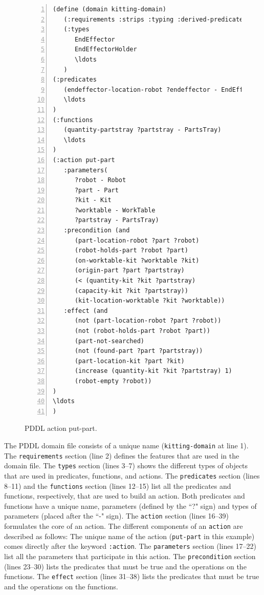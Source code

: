 \begin{figure}[t!h!]
\centering
\begin{minipage}{.5\paperwidth}
\begin{list}{}{\setlength{\leftmargin}{1em}}\item\small
\begin{Verbatim}[commandchars=\\\{\},fontsize=\scriptsize, numbers=left, numbersep=2pt]
(define (domain kitting-domain)
   (:requirements :strips :typing :derived-predicates :action-costs :fluents)
   (:types
      EndEffector
      EndEffectorHolder 
      \ldots
   )
(:predicates
   (endeffector-location-robot ?endeffector - EndEffector ?robot - Robot)	
   \ldots
)
(:functions
   (quantity-partstray ?partstray - PartsTray)
   \ldots
)
(:action put-part
   :parameters(
      ?robot - Robot
      ?part - Part
      ?kit - Kit
      ?worktable - WorkTable
      ?partstray - PartsTray)
   :precondition (and
      (part-location-robot ?part ?robot)
      (robot-holds-part ?robot ?part)
      (on-worktable-kit ?worktable ?kit)
      (origin-part ?part ?partstray)
      (< (quantity-kit ?kit ?partstray)
      (capacity-kit ?kit ?partstray))
      (kit-location-worktable ?kit ?worktable))
   :effect (and
      (not (part-location-robot ?part ?robot))
      (not (robot-holds-part ?robot ?part))
      (part-not-searched)
      (not (found-part ?part ?partstray))
      (part-location-kit ?part ?kit)
      (increase (quantity-kit ?kit ?partstray) 1)
      (robot-empty ?robot))
)
\ldots
)
\end{Verbatim}
\end{list}
\end{minipage}
\caption{PDDL action put-part.}
\label{fig:put-part}
\end{figure}
The PDDL domain file consists of a unique name (\texttt{kitting-domain} at line 1). The \texttt{requirements} section (line 2) defines the features that are used in the domain file. The \texttt{types} section (lines 3--7) shows the different types of objects that are used in predicates, functions, and actions. The \texttt{predicates} section (lines 8--11) and the \texttt{functions} section (lines 12--15) list all the predicates and functions, respectively, that are used to build an action. Both predicates and functions have a unique name, parameters (defined by the ``?" sign) and types of parameters (placed after the ``-" sign). The \texttt{action} section (lines 16--39) formulates the core of an action. The different components of an \texttt{action} are described as follows: The unique name of the action (\texttt{put-part} in this example) comes directly after the keyword \texttt{:action}. The \texttt{parameters} section (lines 17--22) list all the parameters that participate in this action. The \texttt{precondition} section (lines 23--30) lists the predicates that must be true and the operations on the functions. The \texttt{effect} section (lines 31--38) lists the predicates that must be true and the operations on the functions.

